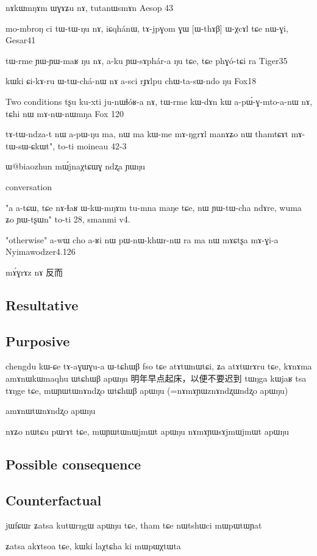 \documentclass[oldfontcommands,oneside,a4paper,11pt]{memoir}
\newcommand{\wav}[1]{}%
\begin{document}
nɤkɯmŋɤm ɯɣɤʑu nɤ, tutanɯsmɤn
Aesop 43

mo-mbroŋ	ci	tɯ-tɯ-ŋu	nɤ,	iɕqhánɯ,	tɤ-jpɣom	ɣɯ	[ɯ-thɤβ]	ɯ-χcɤl	tɕe	nɯ-ɣi,
Gesar41

tɯ-rme ɲɯ-ɲɯ-maʁ ŋu nɤ, a-ku ɲɯ-sɤphár-a ŋu tɕe, tɕe phɣó-tɕi ra
Tiger35

kɯki	ɕi-kɤ-ru	ɯ-tɯ-chá-nɯ	nɤ	a-sci	rɟɤlpu	chɯ-ta-sɯ-ndo	ŋu
Fox18	


Two conditions
tʂu	ku-xti	ju-nɯɬóʁ-a	nɤ,	tɯ-rme	kɯ-dɤn	kɯ	a-pɯ́-ɣ-mto-a-nɯ	nɤ, tɕhi	nɯ	mɤ-nɯ-nɯmŋa
Fox 120

tɤ-tɯ-ndza-t	nɯ	a-pɯ-ŋu	ma,	nɯ	ma	kɯ-me	mɤ-ŋgrɤl	manɤʑo	nɯ	thamtɕɤt	mɤ-tɯ-sɯ-ɕkɯt",	to-ti
moineau 42-3


ɯ@biaozhun mɯ́jnaχtɕɯɣ ndʐa ɲɯŋu
\wav{8_biaozhun}
conversation

"a a-tɕɯ, tɕe nɤ-ɬaʁ ɯ-kɯ-mŋɤm tu-mna maŋe tɕe, nɯ ɲɯ-tɯ-cha ndɤre, wuma ʑo ɲɯ-tʂɯn" to-ti
28, smanmi v4.

"otherwise"
a-wɯ cho a-ʁi nɯ pɯ-nɯ-khɯr-nɯ ra ma nɯ mɤɕtʂa mɤ-ɣi-a
Nyimawodzer4.126




mɤ́ɣrɤz nɤ 反而
\subsection{Resultative}

\subsection{Purposive}
chengdu kɯ-ɕe tɤ-aɣɯɣu-a
ɯ-tɕhɯβ
\xv fso tɕe atɤtɯnɯtɕi, ʑa atɤtɯrɤru tɕe, kɤnɤma amɤnɯkɯmaqhu ɯtɕhɯβ apɯŋu
\xn 明年早点起床，以便不要迟到
\xv tɯŋga kɯjaʁ tsa tɤŋge tɕe, mɯɲɯtɯnɤndʐo ɯtɕhɯβ apɯŋu (=nɤmɤɲɯznɤndʐɯndʐo apɯŋu)

amɤnɯtɯnɤndʐo apɯŋu

\wav{8_WtChWB}

nɤʑo nɯtɕu pɯrɤt tɕe, mɯɲɯtɯnɯjmɯt apɯŋu
nɤmɤɲɯsɤjmɯjmɯt apɯŋu
\wav{8_WtChWB2}
\subsection{Possible consequence}


\subsection{Counterfactual}
jɯfɕɯr ʑatsa kutɯrŋgɯ apɯŋu tɕe, tham tɕe nɯtshɯci mɯpɯtɯɲat

ʑatsa akɤtsoa tɕe, kɯki laχtɕha ki mɯpɯχtɯta
\end{document}
